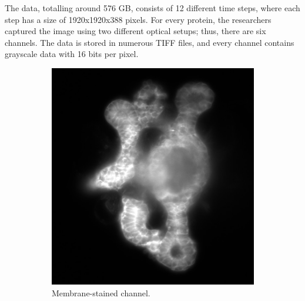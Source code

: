 \documentclass[
  digital,     %
  oneside,     %
  nosansbold,  %
  nocolorbold, %
  lof,         %
  lot,         %
]{fithesis4}
\begin{document}
The data, totalling around 576 GB, consists of 12 different time steps, where
each step has a size of 1920x1920x388 pixels. For every protein, the researchers
captured the image using two different optical setups; thus, there are six
channels. The data is stored in numerous TIFF files, and every channel contains
grayscale data with 16 bits per pixel. 
\begin{figure}
    \begin{subfigure}[t]{0.4\textwidth}
        \centering
        \includegraphics[width=\textwidth]{resources/C3-t006-200-scaled.jpg}
        \caption{Membrane-stained channel.}
        \label{fig:data_example_membraine}
    \end{subfigure}
    \begin{subfigure}[t]{0.4\textwidth}
        \centering

\end{subfigure}
\end{figure}
\end{document}
